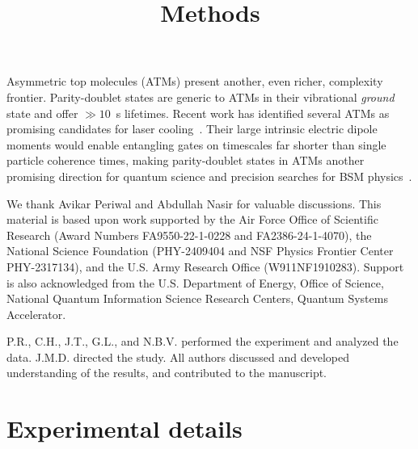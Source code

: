 \documentclass[
superscriptaddress,
twocolumn,
amsmath,amssymb,
aps,
prx,
nofootinbib,
]{revtex4-2}
\begin{document}
Asymmetric top molecules (ATMs) present another, even richer, complexity frontier. Parity-doublet states are generic to ATMs in their vibrational {\sl{ground}} state and offer $\gg10$~s lifetimes. Recent work has identified several ATMs as promising candidates for laser cooling~\cite{kozyryev2016MOR, Augenbraun2020ATM, Seanthesis,frenett2024vibrational}. Their large intrinsic electric dipole moments would enable entangling gates on timescales far shorter than single particle coherence times, making parity-doublet states in ATMs another promising direction for quantum science and precision searches for BSM physics~\cite{kozyryev2016MOR,Hutzler2020, Augenbraun2020ATM}.

We thank Avikar Periwal and Abdullah Nasir for valuable discussions. This material is based upon work supported by the Air Force Office of Scientific Research (Award Numbers FA9550-22-1-0228 and FA2386-24-1-4070), the National Science Foundation (PHY-2409404 and NSF Physics Frontier Center PHY-2317134), and the U.S. Army Research Office (W911NF1910283). Support is also acknowledged from the U.S. Department of Energy, Office of Science, National Quantum Information Science Research Centers, Quantum Systems Accelerator.

P.R., C.H., J.T., G.L., and N.B.V. performed the experiment and analyzed the data. J.M.D. directed the study. All authors discussed and developed understanding of the results, and contributed to the manuscript.



\title{Methods}



\maketitle
\setcounter{figure}{0}
\renewcommand{\thefigure}{S\arabic{figure}}
\newpage

\section{Experimental details}
\end{document}
